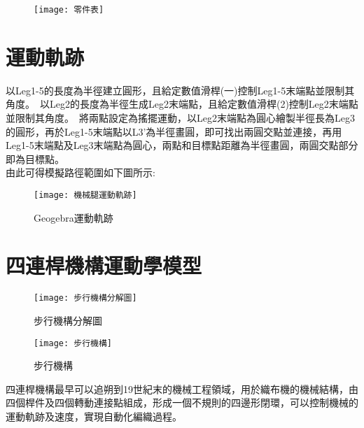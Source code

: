 \begin{figure}[hbt!]
\begin{center}
\texttt{[image: 零件表]}
\label{零件表}
\end{center}
\end{figure}
\newpage


\section{運動軌跡}
以Leg1-5的長度為半徑建立圓形，且給定數值滑桿(一)控制Leg1-5末端點並限制其角度。\
以Leg2的長度為半徑生成Leg2末端點，且給定數值滑桿(2)控制Leg2末端點並限制其角度。\
將兩點設定為搖擺運動，以Leg2末端點為圓心繪製半徑長為Leg3的圓形，再於Leg1-5末端點以L3’為半徑畫圓，即可找出兩圓交點並連接，再用Leg1-5末端點及Leg3末端點為圓心，兩點和目標點距離為半徑畫圓，兩圓交點部分即為目標點。\\

由此可得模擬路徑範圍如下圖所示:\\
\begin{figure}[hbt!]
\begin{center}
\texttt{[image: 機械腿運動軌跡]}
\caption{\Large Geogebra運動軌跡}\label{機械腿運動軌跡}
\end{center}
\end{figure}
\newpage

\section{四連桿機構運動學模型}

\begin{figure}[htbp]
  \begin{minipage}[t]{0.5\linewidth}
    \centering
    \texttt{[image: 步行機構分解圖]}
    \caption{步行機構分解圖}
    \label{步行機構分解圖}
  \end{minipage}
  \hfill
  \begin{minipage}[t]{0.4\linewidth}
    \centering
    \texttt{[image: 步行機構]}
    \caption{步行機構}
    \label{步行機構}
  \end{minipage}
\end{figure}

四連桿機構最早可以追朔到19世紀末的機械工程領域，用於織布機的機械結構，由四個桿件及四個轉動連接點組成，形成一個不規則的四邊形閉環，可以控制機械的運動軌跡及速度，實現自動化編織過程。\\

